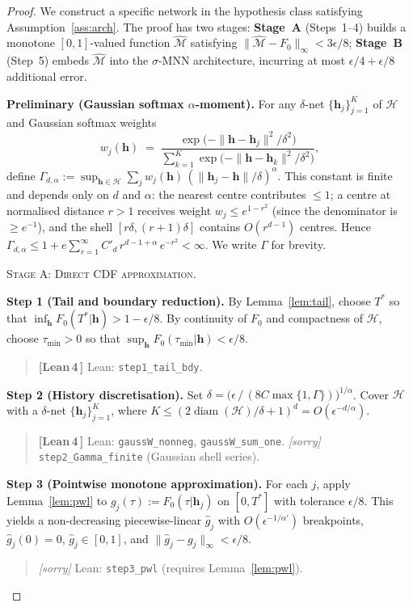 \documentclass[11pt]{article}
\theoremstyle{remark}
\newcommand{\verified}{%
  \textcolor{green!60!black}{\textbf{[Lean\,4\,\checkmark]}}}
\newcommand{\sorrymark}{%
  \textcolor{orange!60!black}{\textit{[sorry]}}}
\newcommand{\cH}{\mathcal{H}}
\newcommand{\cM}{\mathcal{M}}
\newcommand{\hhat}{\boldsymbol{h}}
\newcommand{\sigmoid}{\sigma}
\begin{document}
\begin{proof}
We construct a specific network in the hypothesis class satisfying
Assumption~\ref{ass:arch}. The proof has two stages:
\textbf{Stage~A} (Steps~1--4) builds a monotone $[0,1]$-valued
function $\hat{\cM}$ satisfying
$\|\hat{\cM} - F_0\|_\infty < 3\epsilon/8$;
\textbf{Stage~B} (Step~5) embeds $\hat{\cM}$ into
the $\sigmoid$-MNN architecture, incurring at most $\epsilon/4 + \epsilon/8$
additional error.

\medskip\noindent\textbf{Preliminary
  (Gaussian softmax $\alpha$-moment).}
For any $\delta$-net $\{\hhat_j\}_{j=1}^K$ of
$\cH$ and Gaussian softmax weights
\[
  w_j(\hhat)
  \;=\;
  \frac{\exp\!\bigl(-\|\hhat - \hhat_j\|^2/\delta^2\bigr)}
       {\sum_{k=1}^K
        \exp\!\bigl(-\|\hhat - \hhat_k\|^2/\delta^2\bigr)},
\]
define
$\Gamma_{d,\alpha}
  := \sup_{\hhat\in\cH}
     \sum_j w_j(\hhat)\,
     (\|\hhat_j - \hhat\|/\delta)^{\alpha}$.
This constant is finite and depends only on $d$ and $\alpha$:
the nearest centre contributes $\le 1$;
a centre at normalised distance $r > 1$ receives weight
$w_j \le e^{1-r^2}$
(since the denominator is $\ge e^{-1}$),
and the shell $[r\delta,(r+1)\delta]$ contains $O(r^{d-1})$ centres.
Hence
$\Gamma_{d,\alpha}
  \le 1 + e\sum_{r=1}^{\infty} C'_d\,r^{d-1+\alpha}\,e^{-r^2}
  < \infty$.
We write $\Gamma$ for brevity.

\medskip\noindent\textsc{Stage A: Direct CDF approximation.}

\textbf{Step 1 (Tail and boundary reduction).}
By Lemma~\ref{lem:tail}, choose $T^*$ so that
$\inf_{\hhat} F_0(T^*|\hhat) > 1 - \epsilon/8$.
By continuity of $F_0$ and compactness of $\cH$, choose
$\tau_{\min} > 0$ so that
$\sup_{\hhat} F_0(\tau_{\min}|\hhat) < \epsilon/8$.
\begin{quote}\small\verified{} Lean: \texttt{step1\_tail\_bdy}.\end{quote}

\textbf{Step 2 (History discretisation).}
Set
$\delta = \bigl(\epsilon\,/\,(8C\max\{1,\Gamma\})\bigr)^{1/\alpha}$.
Cover $\cH$ with a $\delta$-net $\{\hhat_j\}_{j=1}^K$, where
$K \le (2\operatorname{diam}(\cH)/\delta + 1)^d
  = O(\epsilon^{-d/\alpha})$.
\begin{quote}\small\verified{} Lean: \texttt{gaussW\_nonneg}, \texttt{gaussW\_sum\_one}.
\sorrymark{} \texttt{step2\_Gamma\_finite} (Gaussian shell series).\end{quote}

\textbf{Step 3 (Pointwise monotone approximation).}
For each $j$, apply Lemma~\ref{lem:pwl} to
$g_j(\tau) := F_0(\tau|\hhat_j)$ on $[0,T^*]$ with tolerance $\epsilon/8$.
This yields a non-decreasing piecewise-linear $\hat{g}_j$ with
$O(\epsilon^{-1/\alpha'})$ breakpoints,
$\hat{g}_j(0) = 0$, $\hat{g}_j \in [0,1]$, and
$\|\hat{g}_j - g_j\|_\infty < \epsilon/8$.
\begin{quote}\small\sorrymark{} Lean: \texttt{step3\_pwl} (requires Lemma~\ref{lem:pwl}).\end{quote}


\end{proof}
\end{document}
